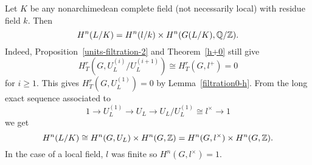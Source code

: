 \begin{rem}
Let $K$ be any nonarchimedean complete field (not necessarily local) with residue field $k$. Then %
\[
H^n(L/K)=H^n(l/k)\times H^n(G(L/K),\mathbb{Q}/\mathbb{Z}).
\]
Indeed, Proposition~\ref{units-filtration-2} and Theorem~\ref{h+0} still give
\[
H_T^r(G,U_L^{(i)}/U_L^{(i+1)})\cong H_T^r(G,l^{+})=0
\]
for $i\ge 1$. This gives $H_T^r(G,U_L^{(1)})=0$ by Lemma~\ref{filtration0-h}. 
From the long exact sequence associated to
\[
1\to U_L^{(1)}\to U_L\to U_L/U_L^{(1)}\cong l^{\times}\to 1
\]
we get
\[
H^n(L/K)\cong H^n(G,U_L)\times H^n(G,\mathbb{Z})=H^n(G,l^{\times})\times H^n(G,\mathbb{Z}).
\]
In the case of a local field, $l$ was finite so $H^n(G,l^{\times})=1$.
\end{rem}
%
